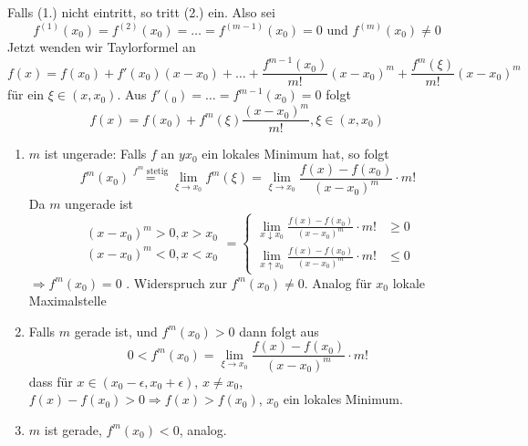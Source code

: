 \begin{beweis}{}
Falls (1.) nicht eintritt, so tritt (2.) ein. Also sei \[f^{(1)}(x_0)=f^{(2)}(x_0)=\dots=f^{(m-1)}(x_0)=0\text{ und }f^{(m)}(x_0)\not=0\]
Jetzt wenden wir Taylorformel an
\[f(x)=f(x_0)+f'(x_0)(x-x_0)+\dots+\frac{f^{m-1}(x_0)}{m!}(x-x_0)^m+\frac{f^{m}(\xi)}{m!}(x-x_0)^m\]
für ein $\xi\in(x,x_0)$. Aus $f'(_0)=\dots=f^{m-1}(x_0)=0$ folgt
\[f(x)=f(x_0)+f^m(\xi)\frac{(x-x_0)^m}{m!}, \xi\in(x,x_0)\]
\begin{enumerate}
\item[\hspace{4mm}(2.1)] $m$ ist ungerade: Falls $f$ an $yx_0$ ein lokales Minimum hat, so folgt
\[{f^m}({x_0})\mathop  = \limits^{{f^m}{\text{ stetig}}} \mathop {\lim }\limits_{\xi  \to {x_0}} {f^m}(\xi ) = \mathop {\lim }\limits_{\xi  \to {x_0}} \frac{{f(x) - f({x_0})}}{{{{(x - {x_0})}^m}}} \cdot m!\]
Da $m$ ungerade ist
\[\begin{array}{*{20}{c}}
{{{(x - {x_0})}^m} > 0,x > {x_0}}\\
{{{(x - {x_0})}^m} < 0,x < {x_0}}
\end{array}=\begin{cases}
\lim\limits_{x\downarrow x_0}\frac{f(x)-f(x_0)}{(x-x_0)^m}\cdot m! & \geq 0\\
\lim\limits_{x\uparrow x_0}\frac{f(x)-f(x_0)}{(x-x_0)^m}\cdot m! & \leq 0
\end{cases}\]
$\Rightarrow f^m(x_0)=0$ . Widerspruch zur $f^m(x_0)\not=0$. Analog für $x_0$ lokale Maximalstelle
\item[\hspace{4mm}(2.2)] Falls $m$ gerade ist, und $f^m(x_0)>0$ dann folgt aus
\[0<f^m(x_0)=\lim\limits_{\xi\to x_0}\frac{f(x)-f(x_0)}{(x-x_0)^m}\cdot m!\]
dass für $x\in(x_0-\epsilon, x_0+\epsilon)$, $x\not=x_0$, $f(x)-f(x_0)>0\Rightarrow f(x)>f(x_0)$, $x_0$ ein lokales Minimum.
\item[\hspace{4mm}(2.3)] $m$ ist gerade,  $f^m(x_0)<0$, analog.
\end{enumerate}
\end{beweis}

